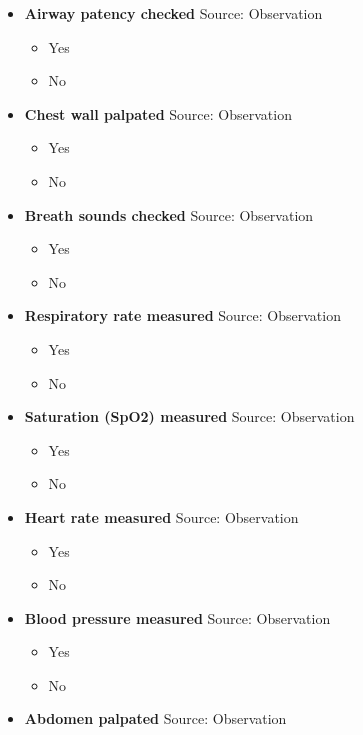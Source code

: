 \documentclass[
]{scrartcl}
\providecommand{\tightlist}{%
  \setlength{\itemsep}{0pt}\setlength{\parskip}{0pt}}\usepackage{longtable,booktabs,array}
\begin{document}
\begin{itemize}
\tightlist
\item
  \textbf{Airway patency checked} Source: Observation

  \begin{itemize}
  \tightlist
  \item
    Yes
  \item
    No
  \end{itemize}
\item
  \textbf{Chest wall palpated} Source: Observation

  \begin{itemize}
  \tightlist
  \item
    Yes
  \item
    No
  \end{itemize}
\item
  \textbf{Breath sounds checked} Source: Observation

  \begin{itemize}
  \tightlist
  \item
    Yes
  \item
    No
  \end{itemize}
\item
  \textbf{Respiratory rate measured} Source: Observation

  \begin{itemize}
  \tightlist
  \item
    Yes
  \item
    No
  \end{itemize}
\item
  \textbf{Saturation (SpO2) measured} Source: Observation

  \begin{itemize}
  \tightlist
  \item
    Yes
  \item
    No
  \end{itemize}
\item
  \textbf{Heart rate measured} Source: Observation

  \begin{itemize}
  \tightlist
  \item
    Yes
  \item
    No
  \end{itemize}
\item
  \textbf{Blood pressure measured} Source: Observation

  \begin{itemize}
  \tightlist
  \item
    Yes
  \item
    No
  \end{itemize}
\item
  \textbf{Abdomen palpated} Source: Observation


\end{itemize}
\end{document}
